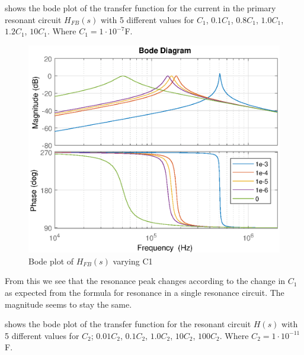  shows the bode plot of the transfer function for the current in the primary resonant circuit $H_{FB}(s)$ with 5 different values for $C_1$, $0.1C_1$, $0.8C_1$, $1.0C_1$, $1.2C_1$, $10C_1$. Where $C_1 = 1 \cdot 10^{-7}$F.
\begin{figure}[H]
    \centering
    \includegraphics[width=\textwidth]{img/FeedBackBode_C1.eps}
    \caption{Bode plot of $H_{FB}(s)$ varying C1}
    \label{fig:fbbode_c1}
\end{figure}

From this we see that the resonance peak changes according to the change in $C_1$ as expected from the formula for resonance in a single resonance circuit. The magnitude seems to stay the same.

\newpage
{} shows the bode plot of the transfer function for the resonant circuit $H(s)$ with 5 different values for $C_2$; $0.01C_2$, $0.1C_2$, $1.0C_2$, $10C_2$, $100C_2$. Where $C_2 = 1 \cdot 10^{-11}$F.

